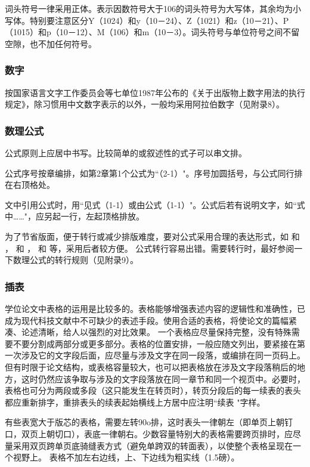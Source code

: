 词头符号一律采用正体。表示因数符号大于106的词头符号为大写体，其余均为小写体。特别要注意区分Y（1024）和y（10－24）、Z（1021）和z（10－21）、P（1015）和p（10－12）、M（106）和m（10－3）。词头符号与单位符号之间不留空隙，也不加任何符号。

\subsubsection{数字}\label{appendixA-6-2-7} 
按国家语言文字工作委员会等七单位1987年公布的《关于出版物上数字用法的执行规定》，除习惯用中文数字表示的以外，一般均采用阿拉伯数字（见附录8）。

\subsubsection{数理公式}\label{appendixA-6-2-8} 
公式原则上应居中书写。比较简单的或叙述性的式子可以串文排。

公式序号按章编排，如第2章第1个公式为``（2-1）"。序号加圆括号，与公式同行排在右顶格处。

文中引用公式时，用``见式（1-1）或由公式（1-1）"。公式后若有说明文字，如``式中……"，应另起一行，左起顶格排放。

为了节省版面，便于转行或减少排版难度，要对公式采用合理的表达形式，如 和 ， 和 ， 和 等，采用后者较方便。
公式转行容易出错。需要转行时，最好参阅一下数理公式的转行规则（见附录9）。

\subsubsection{插表}\label{appendixA-6-2-9} 
学位论文中表格的运用是比较多的。表格能够增强表述内容的逻辑性和准确性，已成为现代科技文献中不可缺少的表述手段。使用合适的表格，将使论文的篇幅紧凑、论述清晰，给人以强烈的对比效果。
一个表格应尽量保持完整，没有特殊需要不要分割成两部分或更多部分。表格的位置安排，一般应随文列出，要紧接在第一次涉及它的文字段后面，应尽量与涉及文字在同一段落，或编排在同一页码上。但有时限于论文结构，或表格容量较大，也可以把表格放在涉及文字段落稍后的地方，这时仍然应该争取与涉及的文字段落放在同一章节和同一个视页中。必要时，表格也可分为两段或多段（这只能发生在转页时），转页分段后的每一续表的表头都应重新排字，重排表头的续表起始横线上方居中应注明``续表 "字样。

有些表宽大于版芯的表格，需要左转90o排，这时表头一律朝左（即单页上朝钉口，双页上朝切口），表底一律朝右。少数容量特别大的表格需要跨页排时，应尽量采用双页跨单页底骑缝表方式（避免单跨双的转面表），以使整个表格呈现在一个视野上。
表格不加左右边线，上、下边线为粗实线（1.5磅）。

